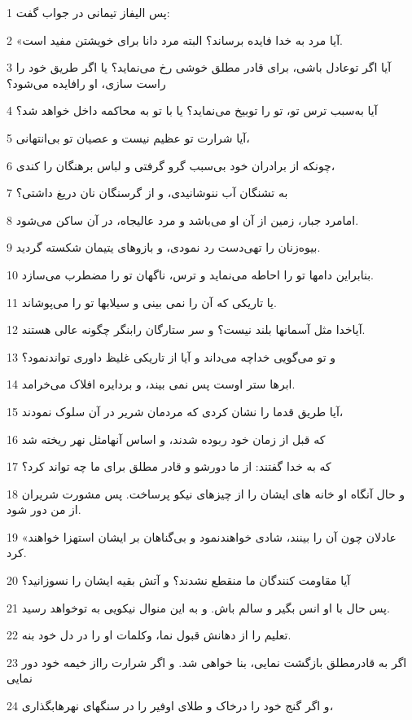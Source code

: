\par 1 پس الیفاز تیمانی در جواب گفت:
\par 2 «آیا مرد به خدا فایده برساند؟ البته مرد دانا برای خویشتن مفید است.
\par 3 آیا اگر توعادل باشی، برای قادر مطلق خوشی رخ می‌نماید؟ یا اگر طریق خود را راست سازی، او رافایده می‌شود؟
\par 4 آیا به‌سبب ترس تو، تو را توبیخ می‌نماید؟ یا با تو به محاکمه داخل خواهد شد؟
\par 5 آیا شرارت تو عظیم نیست و عصیان تو بی‌انتهانی،
\par 6 چونکه از برادران خود بی‌سبب گرو گرفتی و لباس برهنگان را کندی،
\par 7 به تشنگان آب ننوشانیدی، و از گرسنگان نان دریغ داشتی؟
\par 8 امامرد جبار، زمین از آن او می‌باشد و مرد عالیجاه، در آن ساکن می‌شود.
\par 9 بیوه‌زنان را تهی‌دست رد نمودی، و بازوهای یتیمان شکسته گردید.
\par 10 بنابراین دامها تو را احاطه می‌نماید و ترس، ناگهان تو را مضطرب می‌سازد.
\par 11 یا تاریکی که آن را نمی بینی و سیلابها تو را می‌پوشاند.
\par 12 آیاخدا مثل آسمانها بلند نیست؟ و سر ستارگان رابنگر چگونه عالی هستند.
\par 13 و تو می‌گویی خداچه می‌داند و آیا از تاریکی غلیظ داوری تواندنمود؟
\par 14 ابرها ستر اوست پس نمی بیند، و بردایره افلاک می‌خرامد.
\par 15 آیا طریق قدما را نشان کردی که مردمان شریر در آن سلوک نمودند،
\par 16 که قبل از زمان خود ربوده شدند، و اساس آنهامثل نهر ریخته شد
\par 17 که به خدا گفتند: از ما دورشو و قادر مطلق برای ما چه تواند کرد؟
\par 18 و حال آنگاه او خانه های ایشان را از چیزهای نیکو پرساخت. پس مشورت شریران از من دور شود.
\par 19 «عادلان چون آن را بینند، شادی خواهندنمود و بی‌گناهان بر ایشان استهزا خواهند کرد.
\par 20 آیا مقاومت کنندگان ما منقطع نشدند؟ و آتش بقیه ایشان را نسوزانید؟
\par 21 پس حال با او انس بگیر و سالم باش. و به این منوال نیکویی به توخواهد رسید.
\par 22 تعلیم را از دهانش قبول نما، وکلمات او را در دل خود بنه.
\par 23 اگر به قادرمطلق بازگشت نمایی، بنا خواهی شد. و اگر شرارت رااز خیمه خود دور نمایی
\par 24 و اگر گنج خود را درخاک و طلای اوفیر را در سنگهای نهرهابگذاری،
